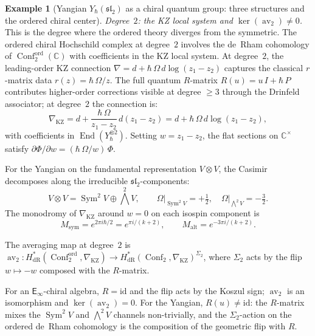 \documentclass[11pt,reqno]{amsart}
\theoremstyle{definition}
\newtheorem{example}[theorem]{Example}
\theoremstyle{remark}
\newcommand{\Einf}{\mathsf{E}_{\infty}}
\DeclareMathOperator{\End}{End}
\DeclareMathOperator{\Conf}{Conf}
\DeclareMathOperator{\av}{av}
\newcommand{\CC}{\mathbb{C}}
\newcommand{\id}{\mathrm{id}}
\numberwithin{equation}{section}
\begin{document}
\begin{example}[Yangian $Y_\hbar(\mathfrak{sl}_2)$
as a chiral quantum group: three structures and the
ordered chiral center]
\smallskip
\noindent\emph{Degree~$2$: the KZ local system and $\ker(\av_2) \neq 0$.}
This is the degree where the ordered theory diverges from
the symmetric. The ordered chiral Hochschild complex at
degree~$2$ involves the de~Rham cohomology of
$\Conf_2^{\mathrm{ord}}(\CC)$ with coefficients in the KZ
local system. At degree~$2$, the leading-order KZ connection
$\nabla = d + \hbar\,\Omega\,d\log(z_1 - z_2)$
captures the classical $r$-matrix data
$r(z) = \hbar\,\Omega/z$. The full quantum $R$-matrix
$R(u) = u\,I + \hbar\,P$ contributes higher-order
corrections visible at degree $\geq 3$ through the Drinfeld
associator; at degree~$2$ the connection is:
\begin{equation}\label{eq:yangian-kz-degree2}
  \nabla_{\mathrm{KZ}}
  = d + \frac{\hbar\,\Omega}{z_1 - z_2}\,d(z_1 - z_2)
  = d + \hbar\,\Omega\,d\log(z_1 - z_2),
\end{equation}
with coefficients in
$\End(Y_\hbar^{\otimes 2})$.
Setting $w = z_1 - z_2$, the flat sections on $\CC^\times$
satisfy $\partial \Phi / \partial w
= (\hbar\,\Omega/w)\,\Phi$.

For the Yangian on the fundamental representation
$V \otimes V$, the Casimir decomposes along the
irreducible $\mathfrak{sl}_2$-components:
\[
  V \otimes V = \operatorname{Sym}^2 V \oplus \bigwedge^2 V,
  \qquad
  \Omega\big|_{\operatorname{Sym}^2 V} = +\tfrac{1}{2},
  \quad
  \Omega\big|_{\bigwedge^2 V} = -\tfrac{3}{2}.
\]
The monodromy of $\nabla_{\mathrm{KZ}}$ around $w = 0$
on each isospin component is
\begin{equation}\label{eq:yangian-monodromy}
  M_{\mathrm{sym}} = e^{2\pi i \hbar/2}
  = e^{\pi i/(k+2)}, \qquad
  M_{\mathrm{alt}} = e^{-3\pi i/(k+2)}.
\end{equation}

The averaging map at degree~$2$ is
$\av_2 \colon H^*_{\mathrm{dR}}(\Conf_2^{\mathrm{ord}},
\nabla_{\mathrm{KZ}}) \to
H^*_{\mathrm{dR}}(\Conf_2,
\nabla_{\mathrm{KZ}})^{\Sigma_2}$,
where $\Sigma_2$ acts by the flip $w \mapsto -w$
composed with the $R$-matrix.

For an $\Einf$-chiral algebra, $R = \id$ and the flip acts
by the Koszul sign; $\av_2$ is an isomorphism and
$\ker(\av_2) = 0$. For the Yangian, $R(u) \neq \id$: the
$R$-matrix mixes the $\operatorname{Sym}^2 V$ and
$\bigwedge^2 V$ channels non-trivially, and the
$\Sigma_2$-action on the ordered de~Rham cohomology is the
composition of the geometric flip with $R$.


\end{example}
\end{document}

